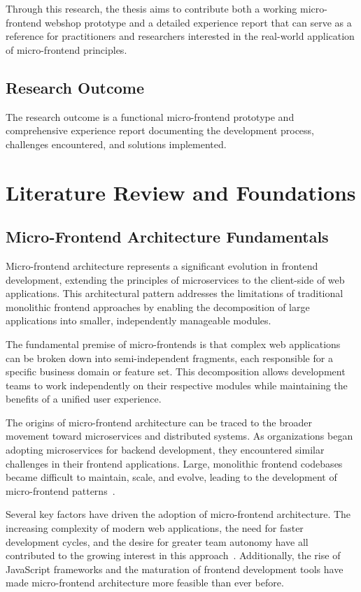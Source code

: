 \documentclass[12pt,a4paper]{report}
\begin{document}
Through this research, the thesis aims to contribute both a working micro-frontend webshop prototype and a detailed experience report that can serve as a reference for practitioners and researchers interested in the real-world application of micro-frontend principles.

\section{Research Outcome}
The research outcome is a functional micro-frontend prototype and comprehensive experience report documenting the development process, challenges encountered, and solutions implemented.

\chapter{Literature Review and Foundations}
\section{Micro-Frontend Architecture Fundamentals}

Micro-frontend architecture represents a significant evolution in frontend development, extending the principles of microservices to the client-side of web applications. This architectural pattern addresses the limitations of traditional monolithic frontend approaches by enabling the decomposition of large applications into smaller, independently manageable modules.

The fundamental premise of micro-frontends is that complex web applications can be broken down into semi-independent fragments, each responsible for a specific business domain or feature set. This decomposition allows development teams to work independently on their respective modules while maintaining the benefits of a unified user experience.

The origins of micro-frontend architecture can be traced to the broader movement toward microservices and distributed systems. As organizations began adopting microservices for backend development, they encountered similar challenges in their frontend applications. Large, monolithic frontend codebases became difficult to maintain, scale, and evolve, leading to the development of micro-frontend patterns~\cite{jackson2016microfrontends}.

Several key factors have driven the adoption of micro-frontend architecture. The increasing complexity of modern web applications, the need for faster development cycles, and the desire for greater team autonomy have all contributed to the growing interest in this approach~\cite{geers2019microfrontends}. Additionally, the rise of JavaScript frameworks and the maturation of frontend development tools have made micro-frontend architecture more feasible than ever before.
\end{document}
